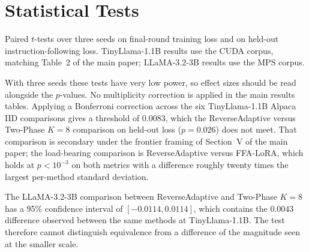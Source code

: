 \documentclass{ieeetj}
\begin{document}
\section{Statistical Tests}
\label{app:stats}
Paired $t$-tests over three seeds on final-round training loss and on held-out instruction-following loss. TinyLlama-1.1B results use the CUDA corpus, matching Table~2 of the main paper; LLaMA-3.2-3B results use the MPS corpus.

With three seeds these tests have very low power, so effect sizes should be read alongside the $p$-values. No multiplicity correction is applied in the main results tables. Applying a Bonferroni correction across the six TinyLlama-1.1B Alpaca IID comparisons gives a threshold of $0.0083$, which the ReverseAdaptive versus Two-Phase $K{=}8$ comparison on held-out loss ($p = 0.026$) does not meet. That comparison is secondary under the frontier framing of Section~V of the main paper; the load-bearing comparison is ReverseAdaptive versus FFA-LoRA, which holds at $p < 10^{-3}$ on both metrics with a difference roughly twenty times the largest per-method standard deviation.

The LLaMA-3.2-3B comparison between ReverseAdaptive and Two-Phase $K{=}8$ has a 95\% confidence interval of $[-0.0114, 0.0114]$, which contains the $0.0043$ difference observed between the same methods at TinyLlama-1.1B. The test therefore cannot distinguish equivalence from a difference of the magnitude seen at the smaller scale.
\end{document}
